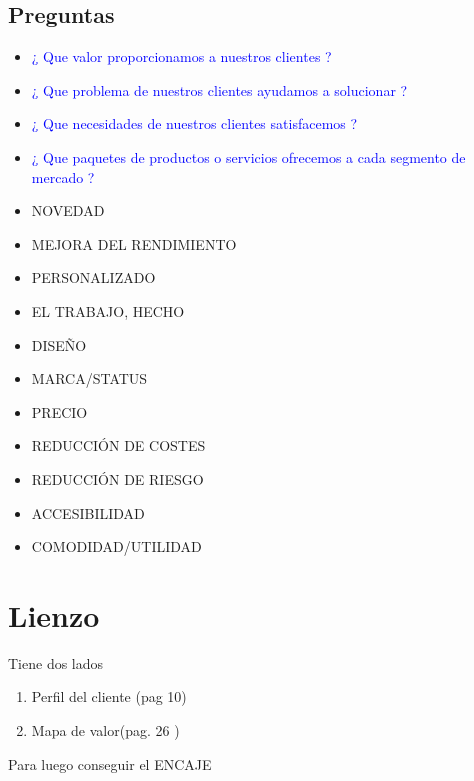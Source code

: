 \documentclass[11pt]{book}
\begin{document}
\section{Preguntas}
\begin{itemize}
\item\textcolor{blue}{¿ Que valor proporcionamos a nuestros clientes ?}
\item\textcolor{blue}{¿ Que problema de nuestros clientes ayudamos a solucionar ?}
\item\textcolor{blue}{¿ Que necesidades de nuestros clientes satisfacemos ?}
\item\textcolor{blue}{¿ Que paquetes de productos o servicios ofrecemos a cada segmento de mercado ?}
\end{itemize}
\begin{itemize}
\item NOVEDAD\\

\item MEJORA DEL RENDIMIENTO\\

\item PERSONALIZADO\\

\item EL TRABAJO, HECHO\\

\item DISEÑO\\

\item MARCA/STATUS\\

\item PRECIO\\

\item REDUCCIÓN DE COSTES\\

\item REDUCCIÓN DE RIESGO\\

\item ACCESIBILIDAD

\item COMODIDAD/UTILIDAD\\

\end{itemize}



\chapter{Lienzo}
Tiene dos lados 
\begin{enumerate}
\item Perfil del cliente (pag 10)
\item Mapa de valor(pag. 26 )
\end{enumerate}
Para luego conseguir el ENCAJE 
\end{document}
